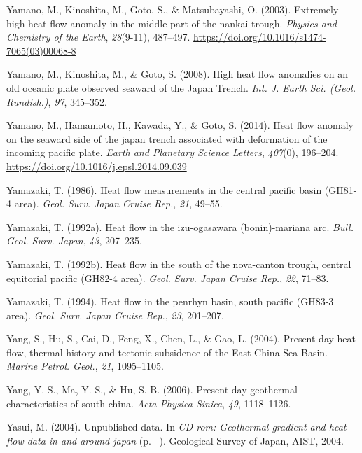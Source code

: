 \begin{CSLReferences}{1}{1}
\leavevmode{}%
Yamano, M., Kinoshita, M., Goto, S., \& Matsubayashi, O. (2003). Extremely high heat flow anomaly in the middle part of the nankai trough. \emph{Physics and Chemistry of the Earth}, \emph{28}(9-11), 487--497. \url{https://doi.org/10.1016/s1474-7065(03)00068-8}

\leavevmode{}%
Yamano, M., Kinoshita, M., \& Goto, S. (2008). High heat flow anomalies on an old oceanic plate observed seaward of the {Japan Trench}. \emph{Int. J. Earth Sci. (Geol. Rundish.)}, \emph{97}, 345--352.

\leavevmode{}%
Yamano, M., Hamamoto, H., Kawada, Y., \& Goto, S. (2014). Heat flow anomaly on the seaward side of the japan trench associated with deformation of the incoming pacific plate. \emph{Earth and Planetary Science Letters}, \emph{407}(0), 196--204. \url{https://doi.org/10.1016/j.epsl.2014.09.039}

\leavevmode{}%
Yamazaki, T. (1986). Heat flow measurements in the central pacific basin (GH81-4 area). \emph{Geol. Surv. Japan Cruise Rep.}, \emph{21}, 49--55.

\leavevmode{}%
Yamazaki, T. (1992a). Heat flow in the izu-ogasawara (bonin)-mariana arc. \emph{Bull. Geol. Surv. Japan}, \emph{43}, 207--235.

\leavevmode{}%
Yamazaki, T. (1992b). Heat flow in the south of the nova-canton trough, central equitorial pacific (GH82-4 area). \emph{Geol. Surv. Japan Cruise Rep.}, \emph{22}, 71--83.

\leavevmode{}%
Yamazaki, T. (1994). Heat flow in the penrhyn basin, south pacific (GH83-3 area). \emph{Geol. Surv. Japan Cruise Rep.}, \emph{23}, 201--207.

\leavevmode{}%
Yang, S., Hu, S., Cai, D., Feng, X., Chen, L., \& Gao, L. (2004). Present-day heat flow, thermal history and tectonic subsidence of the {East China Sea Basin}. \emph{Marine Petrol. Geol.}, \emph{21}, 1095--1105.

\leavevmode{}%
Yang, Y.-S., Ma, Y.-S., \& Hu, S.-B. (2006). Present-day geothermal characteristics of south china. \emph{Acta Physica Sinica}, \emph{49}, 1118--1126.

\leavevmode{}%
Yasui, M. (2004). Unpublished data. In \emph{CD rom: Geothermal gradient and heat flow data in and around japan} (p. --). Geological Survey of Japan, AIST, 2004.


\end{CSLReferences}
